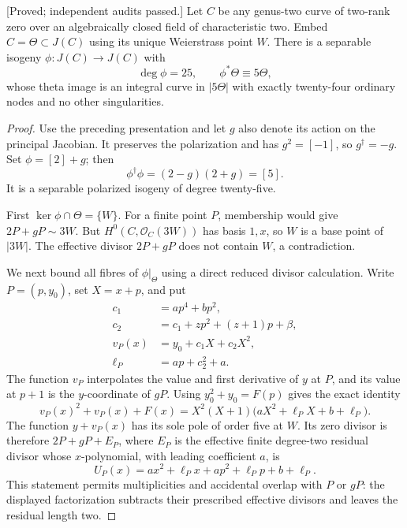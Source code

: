 \begin{theorem}
\label{thm:uniform-f0-five-self-isogeny-nodal-candidate}
\textup{[Proved; independent audits passed.]}
Let $C$ be any genus-two curve of two-rank zero over an algebraically
closed field of characteristic two. Embed $C=\Theta\subset J(C)$
using its unique Weierstrass point $W$. There is a separable isogeny
$\phi:J(C)\to J(C)$ with
\[
                \deg\phi=25,\qquad \phi^*\Theta\equiv5\Theta,
\]
whose theta image is an integral curve in $|5\Theta|$ with exactly
twenty-four ordinary nodes and no other singularities.
\end{theorem}
\begin{proof}
Use the preceding presentation and let $g$ also denote its action
on the principal Jacobian. It preserves the polarization and has
$g^2=[-1]$, so $g^\dagger=-g$. Set $\phi=[2]+g$; then
\[
                   \phi^\dagger\phi=(2-g)(2+g)=[5].
\]
It is a separable polarized isogeny of degree twenty-five.

First $\ker\phi\cap\Theta=\{W\}$. For a finite point $P$, membership
would give $2P+gP\sim3W$. But $H^0(C,\mathcal O_C(3W))$
has basis $1,x$, so $W$ is a base point of $|3W|$. The effective
divisor $2P+gP$ does not contain $W$, a contradiction.

We next bound all fibres of $\phi|_\Theta$ using a direct reduced
divisor calculation. Write $P=(p,y_0)$, set $X=x+p$, and put
\[
 \begin{split}
 c_1&=a p^4+b p^2,\\
 c_2&=c_1+z p^2+(z+1)p+\beta,\\
 v_P(x)&=y_0+c_1X+c_2X^2,\\
 \ell_P&=a p+c_2^2+a.
 \end{split}
\]
The function $v_P$ interpolates the value and first derivative of
$y$ at $P$, and its value at $p+1$ is the $y$-coordinate of $gP$.
Using $y_0^2+y_0=F(p)$ gives the exact identity
\[
 v_P(x)^2+v_P(x)+F(x)
       =X^2(X+1)\bigl(aX^2+\ell_PX+b+\ell_P\bigr).
\]
The function $y+v_P(x)$ has its sole pole of order five at $W$.
Its zero divisor is therefore $2P+gP+E_P$, where $E_P$ is the
effective finite degree-two residual divisor whose $x$-polynomial,
with leading coefficient $a$, is
\[
 U_P(x)=a x^2+\ell_Px+
                        a p^2+\ell_Pp+b+\ell_P.
\]
This statement permits multiplicities and accidental overlap with
$P$ or $gP$: the displayed factorization subtracts their prescribed
effective divisors and leaves the residual length two.


\end{proof}
